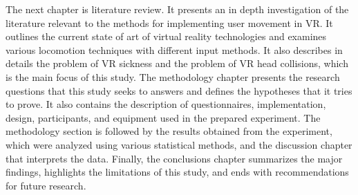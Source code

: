 The next chapter is literature review. It presents an in depth investigation of the literature relevant to the methods for implementing user movement in VR. It outlines the current state of art of virtual reality technologies and examines various locomotion techniques with different input methods. It also describes in details the problem of VR sickness and the problem of VR head collisions, which is the main focus of this study. The methodology chapter presents the research questions that this study seeks to answers and defines the hypotheses that it tries to prove. It also contains the description of questionnaires, implementation, design, participants, and equipment used in the prepared experiment. The methodology section is followed by the results obtained from the experiment, which were analyzed using various statistical methods, and the discussion chapter that interprets the data. Finally, the conclusions chapter summarizes the major findings, highlights the limitations of this study, and ends with recommendations for future research.